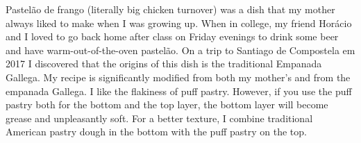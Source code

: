\documentclass[11pt,letterpaper]{article}
\begin{document}


Pastel\~ao de frango (literally big chicken turnover) was a dish that my mother always liked to make when I was growing up. When in college, my friend Hor\'acio and I loved to go back home after class on Friday evenings to drink some beer and have warm-out-of-the-oven pastel\~ao. On a trip to Santiago de Compostela em 2017 I discovered that the origins of this dish is the traditional Empanada Gallega. My recipe is significantly modified from both my mother's and from the empanada Gallega. I like the flakiness of puff pastry. However, if you use the puff pastry both for the bottom and the top layer, the bottom layer will become grease and unpleasantly soft. For a better texture, I combine traditional American pastry dough in the bottom with the puff pastry on the top. 
\end{document}
